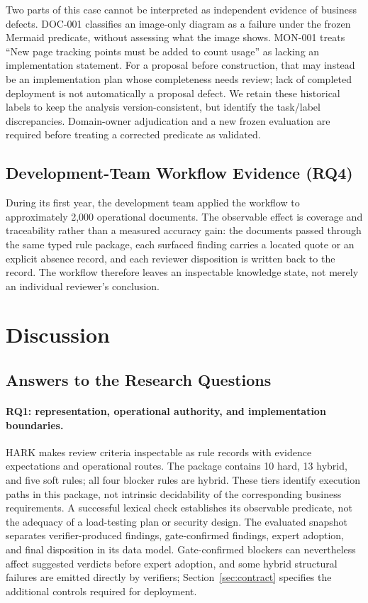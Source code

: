 \documentclass[computers,article,submit,moreauthors]{Definitions/mdpi}
\begin{document}
Two parts of this case cannot be interpreted as independent evidence of business defects. DOC-001 classifies an image-only diagram as a failure under the frozen Mermaid predicate, without assessing what the image shows. MON-001 treats ``New page tracking points must be added to count usage'' as lacking an implementation statement. For a proposal before construction, that may instead be an implementation plan whose completeness needs review; lack of completed deployment is not automatically a proposal defect. We retain these historical labels to keep the analysis version-consistent, but identify the task/label discrepancies. Domain-owner adjudication and a new frozen evaluation are required before treating a corrected predicate as validated.

\subsection{Development-Team Workflow Evidence (RQ4)}\label{sec:pilot}

During its first year, the development team applied the workflow to approximately 2,000 operational documents. The observable effect is coverage and traceability rather than a measured accuracy gain: the documents passed through the same typed rule package, each surfaced finding carries a located quote or an explicit absence record, and each reviewer disposition is written back to the record. The workflow therefore leaves an inspectable knowledge state, not merely an individual reviewer's conclusion.

\section{Discussion}\label{sec:discussion}

\subsection{Answers to the Research Questions}

\paragraph{RQ1: representation, operational authority, and implementation boundaries.}
HARK makes review criteria inspectable as rule records with evidence expectations and operational routes. The package contains 10 hard, 13 hybrid, and five soft rules; all four blocker rules are hybrid. These tiers identify execution paths in this package, not intrinsic decidability of the corresponding business requirements. A successful lexical check establishes its observable predicate, not the adequacy of a load-testing plan or security design. The evaluated snapshot separates verifier-produced findings, gate-confirmed findings, expert adoption, and final disposition in its data model. Gate-confirmed blockers can nevertheless affect suggested verdicts before expert adoption, and some hybrid structural failures are emitted directly by verifiers; Section~\ref{sec:contract} specifies the additional controls required for deployment.
\end{document}
